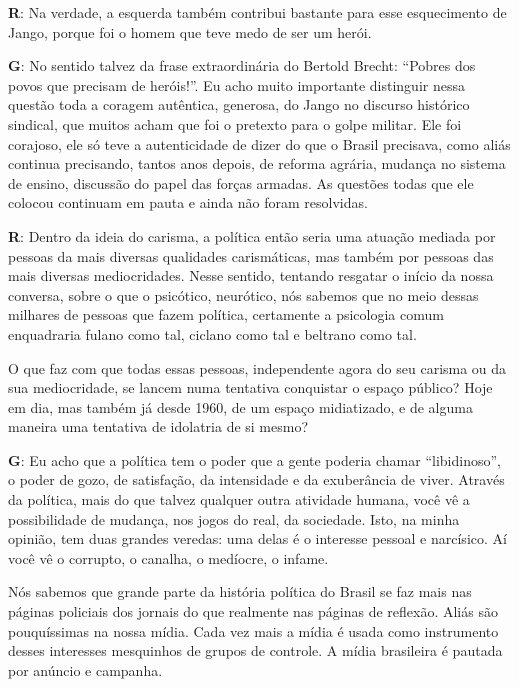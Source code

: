  

\textbf{R}: Na verdade, a esquerda também contribui bastante para esse
esquecimento de Jango, porque foi o homem que teve medo de ser um herói.

 

\textbf{G}: No sentido talvez da frase extraordinária do Bertold Brecht:
``Pobres dos povos que precisam de heróis!''. Eu acho muito importante
distinguir nessa questão toda a coragem autêntica, generosa, do Jango no
discurso histórico sindical, que muitos acham que foi o pretexto para o
golpe militar. Ele foi corajoso, ele só teve a autenticidade de dizer do
que o Brasil precisava, como aliás continua precisando, tantos anos
depois, de reforma agrária, mudança no sistema de ensino, discussão do
papel das forças armadas. As questões todas que ele colocou continuam em
pauta e ainda não foram resolvidas.

 

\textbf{R}: Dentro da ideia do carisma, a política então seria uma
atuação mediada por pessoas da mais diversas qualidades carismáticas,
mas também por pessoas das mais diversas mediocridades. Nesse sentido,
tentando resgatar o início da nossa conversa, sobre o que o psicótico,
neurótico, nós sabemos que no meio dessas milhares de pessoas que fazem
política, certamente a psicologia comum enquadraria fulano como tal,
ciclano como tal e beltrano como tal.

 

O que faz com que todas essas pessoas, independente agora do seu carisma
ou da sua mediocridade, se lancem numa tentativa conquistar o espaço
público? Hoje em dia, mas também já desde 1960, de um espaço
midiatizado, e de alguma maneira uma tentativa de idolatria de si mesmo?

 

\textbf{G}: Eu acho que a política tem o poder que a gente poderia
chamar ``libidinoso'', o poder de gozo, de satisfação, da intensidade e
da exuberância de viver. Através da política, mais do que talvez
qualquer outra atividade humana, você vê a possibilidade de mudança, nos
jogos do real, da sociedade. Isto, na minha opinião, tem duas grandes
veredas: uma delas é o interesse pessoal e narcísico. Aí você vê o
corrupto, o canalha, o medíocre, o infame.

 

Nós sabemos que grande parte da história política do Brasil se faz mais
nas páginas policiais dos jornais do que realmente nas páginas de
reflexão. Aliás são pouquíssimas na nossa mídia. Cada vez mais a mídia é
usada como instrumento desses interesses mesquinhos de grupos de
controle. A mídia brasileira é pautada por anúncio e campanha. 

